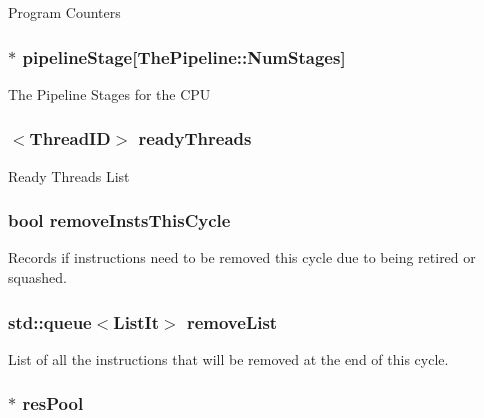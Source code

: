 \label{classInOrderCPU_a61bb24b7355c86288cba2cd9d51ad1ed}
Program Counters \hypertarget{classInOrderCPU_aae220dcd072e514a6cf72df0abf36d42}{
\subsubsection[{pipelineStage}]{$\ast$ {\bf pipelineStage}\mbox{[}{\bf ThePipeline::NumStages}\mbox{]}}}
\label{classInOrderCPU_aae220dcd072e514a6cf72df0abf36d42}
The Pipeline Stages for the CPU \hypertarget{classInOrderCPU_afcee8801ebda6ab96f79e89b9618fc31}{
\subsubsection[{readyThreads}]{$<${\bf ThreadID}$>$ {\bf readyThreads}}}
\label{classInOrderCPU_afcee8801ebda6ab96f79e89b9618fc31}
Ready Threads List \hypertarget{classInOrderCPU_a2825a91132fe292d64dca3c61fd07410}{
\subsubsection[{removeInstsThisCycle}]{\setlength{\rightskip}{0pt plus 5cm}bool {\bf removeInstsThisCycle}}}
\label{classInOrderCPU_a2825a91132fe292d64dca3c61fd07410}
Records if instructions need to be removed this cycle due to being retired or squashed. \hypertarget{classInOrderCPU_a574cb1bed7660bb2bb6940365f6a3315}{
\subsubsection[{removeList}]{\setlength{\rightskip}{0pt plus 5cm}std::queue$<${\bf ListIt}$>$ {\bf removeList}}}
\label{classInOrderCPU_a574cb1bed7660bb2bb6940365f6a3315}
List of all the instructions that will be removed at the end of this cycle. \hypertarget{classInOrderCPU_a2979f0f9689d1d8615cacdc85c65e11f}{
\subsubsection[{resPool}]{$\ast$ {\bf resPool}}}
